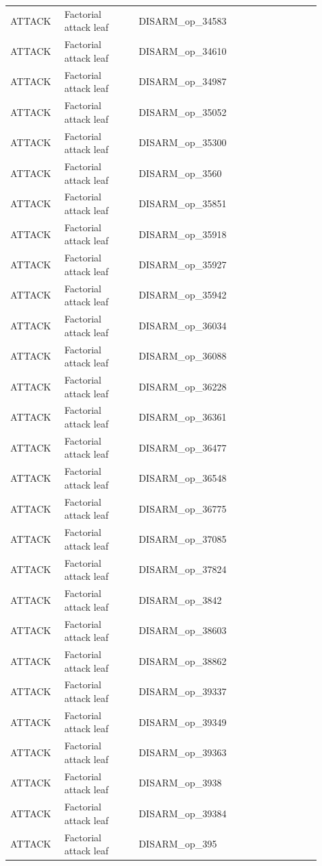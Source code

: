 \begin{table}[htbp]
\begin{threeparttable}
\begin{tabular}{p{0.14\linewidth}p{0.22\linewidth}p{0.54\linewidth}}
ATTACK & Factorial attack leaf & DISARM\_op\_34583 \\
ATTACK & Factorial attack leaf & DISARM\_op\_34610 \\
ATTACK & Factorial attack leaf & DISARM\_op\_34987 \\
ATTACK & Factorial attack leaf & DISARM\_op\_35052 \\
ATTACK & Factorial attack leaf & DISARM\_op\_35300 \\
ATTACK & Factorial attack leaf & DISARM\_op\_3560 \\
ATTACK & Factorial attack leaf & DISARM\_op\_35851 \\
ATTACK & Factorial attack leaf & DISARM\_op\_35918 \\
ATTACK & Factorial attack leaf & DISARM\_op\_35927 \\
ATTACK & Factorial attack leaf & DISARM\_op\_35942 \\
ATTACK & Factorial attack leaf & DISARM\_op\_36034 \\
ATTACK & Factorial attack leaf & DISARM\_op\_36088 \\
ATTACK & Factorial attack leaf & DISARM\_op\_36228 \\
ATTACK & Factorial attack leaf & DISARM\_op\_36361 \\
ATTACK & Factorial attack leaf & DISARM\_op\_36477 \\
ATTACK & Factorial attack leaf & DISARM\_op\_36548 \\
ATTACK & Factorial attack leaf & DISARM\_op\_36775 \\
ATTACK & Factorial attack leaf & DISARM\_op\_37085 \\
ATTACK & Factorial attack leaf & DISARM\_op\_37824 \\
ATTACK & Factorial attack leaf & DISARM\_op\_3842 \\
ATTACK & Factorial attack leaf & DISARM\_op\_38603 \\
ATTACK & Factorial attack leaf & DISARM\_op\_38862 \\
ATTACK & Factorial attack leaf & DISARM\_op\_39337 \\
ATTACK & Factorial attack leaf & DISARM\_op\_39349 \\
ATTACK & Factorial attack leaf & DISARM\_op\_39363 \\
ATTACK & Factorial attack leaf & DISARM\_op\_3938 \\
ATTACK & Factorial attack leaf & DISARM\_op\_39384 \\
ATTACK & Factorial attack leaf & DISARM\_op\_395 \\

\end{tabular}
\end{threeparttable}
\end{table}
